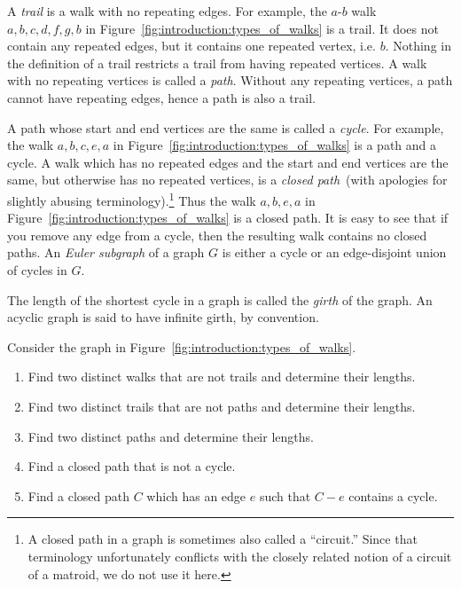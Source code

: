 A \emph{trail} is a walk with no repeating edges. For example, the
$a$-$b$ walk $a, b, c, d, f, g, b$ in
Figure~\ref{fig:introduction:types_of_walks} is a trail. It does not
contain any repeated edges, but it contains one repeated vertex,
i.e. $b$. Nothing in the definition of a trail restricts a trail from
having repeated vertices.
A walk with no repeating vertices is called a \emph{path}. Without any
repeating vertices, a path cannot have repeating edges, hence a path
is also a trail.

A path whose start and end vertices are the same is
called a \emph{cycle}. For example, the walk $a, b, c, e, a$
in Figure~\ref{fig:introduction:types_of_walks} is a path and a cycle.
A walk which has no repeated edges and the start and end vertices are
the same, but otherwise has no  repeated vertices, is
a \emph{closed path}~(with apologies for slightly abusing
terminology).\footnote{
A closed path in a graph is sometimes also called a ``circuit.'' Since
that terminology unfortunately conflicts with the closely related
notion of a circuit of a matroid, we do not use it here.}
Thus the walk $a, b, e, a$ in
Figure~\ref{fig:introduction:types_of_walks} is a closed path. It is
easy to see that if you remove any edge from a cycle, then the
resulting walk contains no closed paths.
An {\it Euler subgraph} of a graph $G$ is either a cycle or
an edge-disjoint union of cycles in $G$.

The length of the shortest cycle in a graph is called
the {\it girth} of the graph. An acyclic graph is said to have
infinite girth, by convention.

\begin{example}
Consider the graph in Figure~\ref{fig:introduction:types_of_walks}.
%
\begin{enumerate}
\item Find two distinct walks that are not trails and determine their
  lengths.

\item Find two distinct trails that are not paths and determine their
  lengths.

\item Find two distinct paths and determine their lengths.

\item Find a closed path that is not a cycle.

\item Find a closed path $C$ which has an edge $e$ such that $C - e$
  contains a cycle.
\end{enumerate}
\end{example}

